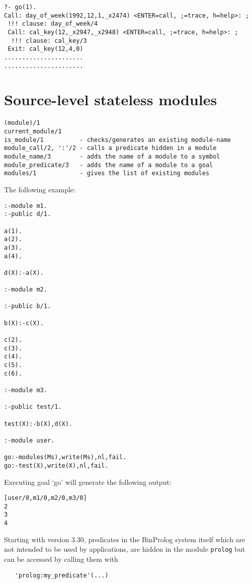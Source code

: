 \documentclass{article}
\begin{document}
{\small \begin{verbatim}
?- go(1).
Call: day_of_week(1992,12,1,_x2474) <ENTER=call, ;=trace, h=help>: ;
 !!! clause: day_of_week/4
 Call: cal_key(12,_x2947,_x2948) <ENTER=call, ;=trace, h=help>: ;
  !!! clause: cal_key/3
 Exit: cal_key(12,4,0)
......................
......................
\end{verbatim}}

\section{Source-level stateless modules}

\begin{verbatim}
(module)/1
current_module/1
is_module/1          - checks/generates an existing module-name
module_call/2, ':'/2 - calls a predicate hidden in a module
module_name/3        - adds the name of a module to a symbol
module_predicate/3   - adds the name of a module to a goal
modules/1            - gives the list of existing modules
\end{verbatim}

The following example:
\begin{verbatim}
:-module m1.
:-public d/1.

a(1).
a(2).
a(3).
a(4).

d(X):-a(X).

:-module m2.

:-public b/1.

b(X):-c(X).

c(2).
c(3).
c(4).
c(5).
c(6).

:-module m3.

:-public test/1.

test(X):-b(X),d(X).

:-module user.

go:-modules(Ms),write(Ms),nl,fail.
go:-test(X),write(X),nl,fail.
\end{verbatim}

Executing goal `go' will generate the following output:

\begin{verbatim}
[user/0,m1/0,m2/0,m3/0]
2
3
4
\end{verbatim}

Starting with version 3.30, predicates in the BinProlog system
itself which are not intended to be used by applications, are hidden in
the module {\tt prolog} but can be accessed by calling them with
\begin{verbatim}
   'prolog:my_predicate'(...)
\end{verbatim}
\end{document}
